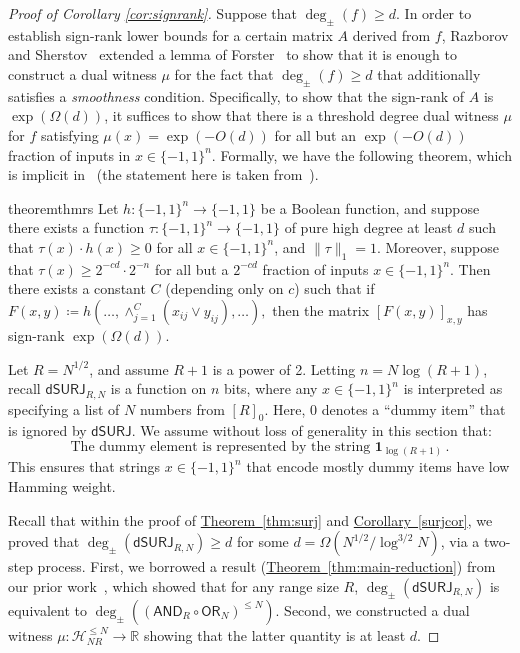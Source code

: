 \documentclass[11pt]{article}
\numberwithin{equation}{section}
\theoremstyle{definition}
\theoremstyle{plain}
\newcommand{\R}{\mathbb R}
\newcommand{\expref}[2]{\hyperref[#2]{#1~\ref{#2}}}
\newcommand{\dumSURJ}{\mathsf{dSURJ}}
\newcommand{\OR}{\mathsf{ OR}}
\newcommand{\bits}{\{-1,1\}}
\newcommand{\AND}{\mathsf{AND}}
\begin{document}
%
\begin{proof}[Proof of Corollary \ref{cor:signrank}]
Suppose that $\deg_{\pm}(f) \geq d$. 
In order to establish sign-rank lower bounds for a certain matrix $A$ derived from $f$, Razborov and Sherstov~\cite{razborovsherstov} extended a lemma of Forster~\cite{forster} to show that it is enough to 
construct a dual witness $\mu$ for the fact that $\deg_{\pm}(f) \geq d$ that additionally satisfies a \emph{smoothness} condition. Specifically,
to show that the sign-rank of $A$ is $\exp(\Omega(d))$, it suffices to show that there is a threshold
degree dual witness $\mu$ for $f$ satisfying $\mu(x) = \exp(-O(d))$ for
all but an $\exp\left(-O(d)\right)$ fraction of inputs in $x \in \{-1, 1\}^n$. Formally, we have the following
theorem, which is implicit in~\cite{razborovsherstov} (the statement here is taken from~\cite[Theorem 4.1]{bt16}). 


\begin{restatable}{theorem}{thmrs} \label{thm:rs}
	Let $h \colon \bits^n \to \bits$ be a Boolean function, and suppose there exists a function $\tau \colon \bits^n \to \bits$ of pure high degree
	at least $d$
	such that $\tau(x) \cdot h(x) \geq 0$ for all $x \in \bits^n$, and $\|\tau\|_1=1$. 
	Moreover, suppose that $\tau(x) \ge 2^{-cd} \cdot 2^{-n}$ for all but a $2^{-cd}$ fraction of inputs $x \in \bits^n$. Then there exists a constant $C$ (depending only on $c$) such that if $F(x, y) \coloneqq  h(\dots, \land_{j = 1}^C (x_{ij} \lor y_{ij}), \dots),$
	then the matrix $[F(x, y)]_{x, y}$ has sign-rank $\exp(\Omega(d))$.
\end{restatable}

Let $R=N^{1/2}$, and assume $R+1$ is a power of 2. Letting $n=N \log(R+1)$, 
recall $\dumSURJ_{R, N}$ is a function on $n$ bits, where any $x \in \bits^n$
is interpreted as specifying a list of $N$ numbers from $[R]_0$. Here, 0 denotes
a ``dummy item'' that is ignored by $\dumSURJ$. 
We assume without loss of generality in this section that:
\begin{equation} 
\label{dummyencoding}
\text{The dummy element is represented by the string } \mathbf{1}_{\log(R+1)}\,.
\end{equation}
This ensures that strings $x \in \bits^n$ that encode mostly dummy items have low Hamming weight.

Recall that within the proof of \expref{Theorem}{thm:surj} and \expref{Corollary}{surjcor}, we proved that $\deg_{\pm}(\dumSURJ_{R, N}) \geq d$ for some $d=\Omega(N^{1/2}/\log^{3/2} N)$, via a two-step process. 
First, we borrowed a result (\expref{Theorem}{thm:main-reduction})
from our prior work~\cite{adegsurj}, which showed that for any range size $R$, $\deg_{\pm}(\dumSURJ_{R, N})$ is equivalent to $\deg_{\pm}\left(\left(\AND_R \circ \OR_N\right)^{\leq N}\right)$. Second, we constructed a dual witness $\mu \colon \mathcal{H}_{NR}^{\leq N} \to \R$ showing that the latter quantity is at least $d$. %


\end{proof}
\end{document}
